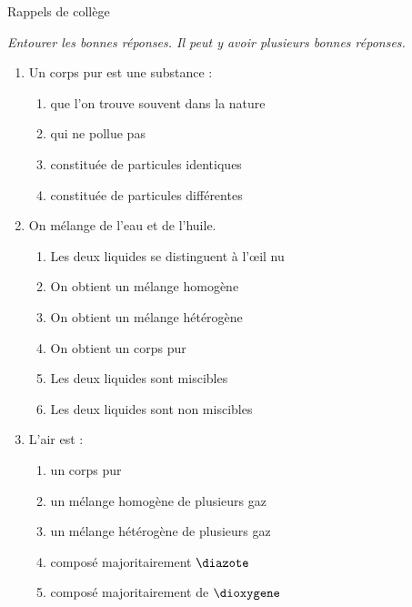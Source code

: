 
\cfoot{}



\begin{header}
Rappels de collège
\end{header}

\noindent
\emph{Entourer les bonnes réponses. Il peut y avoir plusieurs bonnes réponses.}

\begin{enumerate}

\item Un corps pur est une substance :
\begin{multicols}{2}
\begin{enumerate}
\item que l'on trouve souvent dans la nature
\item qui ne pollue pas
\item constituée de particules identiques
\item constituée de particules différentes
\end{enumerate}
\end{multicols}

\item On mélange de l'eau et de l'huile.
\begin{multicols}{2}
\begin{enumerate}
\item Les deux liquides se distinguent à l'œil nu
\item On obtient un mélange homogène
\item On obtient un mélange hétérogène
\item On obtient un corps pur
\item Les deux liquides sont miscibles
\item Les deux liquides sont non miscibles
\end{enumerate}
\end{multicols}

\item L'air est :
\begin{multicols}{2}
\begin{enumerate}
\item un corps pur
\item un mélange homogène de plusieurs gaz
\item un mélange hétérogène de plusieurs gaz
\item composé majoritairement $\diazote$
\item composé majoritairement de $\dioxygene$
\end{enumerate}
\end{multicols}


\end{enumerate}
